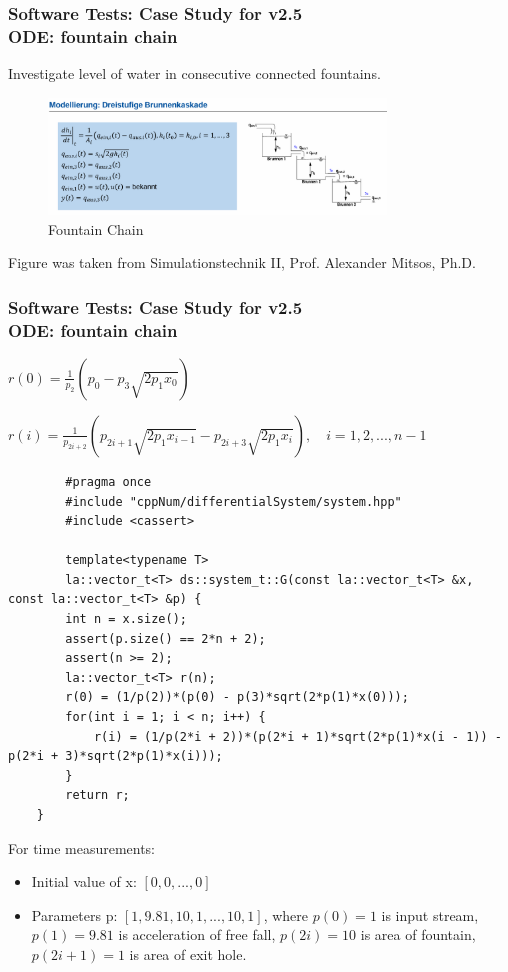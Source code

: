 \documentclass[ucs,10pt]{beamer}
\begin{document}
\begin{frame}[fragile]
\frametitle{Software Tests: Case Study for v2.5 \\
	\small \color{rwth-blue} ODE: fountain chain}
	Investigate level of water in consecutive connected fountains.
	\begin{figure}
		\centering
		\includegraphics[width=0.8\textwidth]{figures/fountain_chain.png}
		\caption{Fountain Chain}
	\end{figure}
	{\tiny *Figure was taken from Simulationstechnik II, Prof. Alexander Mitsos, Ph.D.}
\end{frame}
	
\begin{frame}[fragile]
\frametitle{Software Tests: Case Study for v2.5 \\
	\small \color{rwth-blue} ODE: fountain chain}
	$r(0) = \frac{1}{p_2} \left( p_0 - p_3 \sqrt{2 p_1 x_0} \right)$
	
	$r(i) = \frac{1}{p_{2i+2}} \left( p_{2i+1} \sqrt{2 p_1 x_{i-1}} - p_{2i+3} \sqrt{2 p_1 x_i} \right), \quad i = 1, 2, ..., n-1$
	\begin{lstlisting}
		#pragma once
		#include "cppNum/differentialSystem/system.hpp"
		#include <cassert>
		
		template<typename T>
		la::vector_t<T> ds::system_t::G(const la::vector_t<T> &x, const la::vector_t<T> &p) {
		int n = x.size();
		assert(p.size() == 2*n + 2);
		assert(n >= 2);
		la::vector_t<T> r(n);
		r(0) = (1/p(2))*(p(0) - p(3)*sqrt(2*p(1)*x(0)));
		for(int i = 1; i < n; i++) {
			r(i) = (1/p(2*i + 2))*(p(2*i + 1)*sqrt(2*p(1)*x(i - 1)) - p(2*i + 3)*sqrt(2*p(1)*x(i)));
		}
		return r;
	}
	\end{lstlisting}
	For time measurements:
        \begin{itemize}
            \item Initial value of x: $[0, 0, ..., 0]$
			\item Parameters p: $[1, 9.81, 10, 1, ..., 10, 1]$, where $p(0)=1$ is input stream, $p(1)=9.81$ is acceleration of free fall, $p(2i)=10$ is area of fountain, $p(2i+1)=1$ is area of exit hole.
        \end{itemize}
\end{frame}
		
\end{document}
